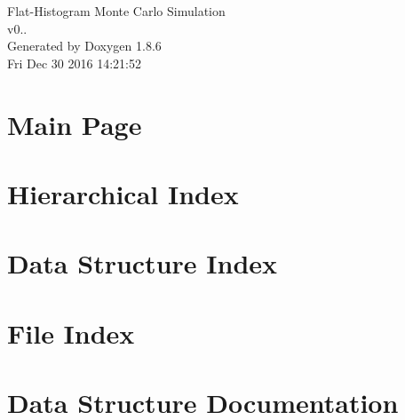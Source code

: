 \documentclass[twoside]{book}
\newcommand{\clearemptydoublepage}{%
  \newpage{\pagestyle{empty}\cleardoublepage}%
}
\begin{document}
\hypersetup{pageanchor=false}
\begin{titlepage}
\vspace*{7cm}
\begin{center}%
{\Large Flat-\/\-Histogram Monte Carlo Simulation \\[1ex]\large v0.. }\\
\vspace*{1cm}
{\large Generated by Doxygen 1.8.6}\\
\vspace*{0.5cm}
{\small Fri Dec 30 2016 14:21:52}\\
\end{center}
\end{titlepage}
\clearemptydoublepage
\tableofcontents
\clearemptydoublepage
{}
\hypersetup{pageanchor=true}

\chapter{Main Page}
\label{index}\hypertarget{index}{}
\chapter{Hierarchical Index}

\chapter{Data Structure Index}

\chapter{File Index}

\chapter{Data Structure Documentation}































\end{document}
